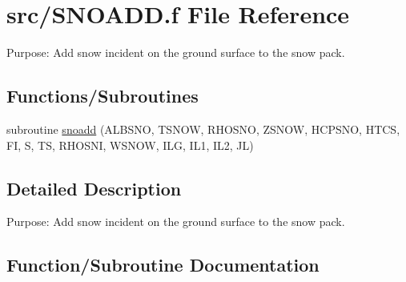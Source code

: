 \hypertarget{SNOADD_8f}{}\section{src/\+S\+N\+O\+A\+D\+D.f File Reference}
\label{SNOADD_8f}


Purpose\+: Add snow incident on the ground surface to the snow pack.  


\subsection*{Functions/\+Subroutines}
\begin{DoxyCompactItemize}
\item 
subroutine \hyperlink{SNOADD_8f_af7d261f12e703bc9bfc7bd0a543d51ae}{snoadd} (A\+L\+B\+S\+N\+O, T\+S\+N\+O\+W, R\+H\+O\+S\+N\+O, Z\+S\+N\+O\+W, H\+C\+P\+S\+N\+O, H\+T\+C\+S, F\+I, S, T\+S, R\+H\+O\+S\+N\+I, W\+S\+N\+O\+W, I\+L\+G, I\+L1, I\+L2, J\+L)
\end{DoxyCompactItemize}


\subsection{Detailed Description}
Purpose\+: Add snow incident on the ground surface to the snow pack. 



\subsection{Function/\+Subroutine Documentation}
\hypertarget{SNOADD_8f_af7d261f12e703bc9bfc7bd0a543d51ae}{}
